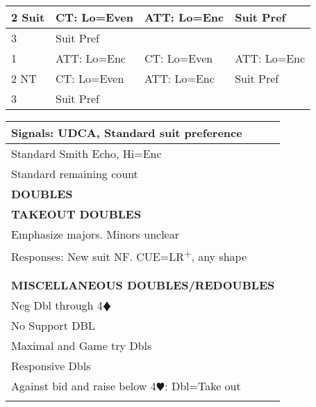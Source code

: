 \documentclass{article}
\newcommand{\he}{\textcolor{RubineRed}{$\varheart$}}
\newcommand{\di}{\textcolor{Peach}{$\vardiamond$}}
\newcommand{\up}{\textsuperscript{+}}
\begin{document}
\begin{minipage}{90mm}
\begin{tabular}{| p{8.9mm} | p{22mm} | p{22mm} | p{22mm} |}
		2 Suit & CT: Lo=Even & ATT: Lo=Enc & Suit Pref \\ \hline
		3 & Suit Pref & & \\ \hline
		1 & ATT: Lo=Enc & CT: Lo=Even & ATT: Lo=Enc \\ \hline
		2 NT & CT: Lo=Even & ATT: Lo=Enc & Suit Pref \\ \hline
		3 & Suit Pref & & \\ \hline
	\end{tabular}
	\begin{tabular}{| p{88mm} |}
		Signals: UDCA, Standard suit preference \\ \hline
		Standard Smith Echo, Hi=Enc \\ \hline
		Standard remaining count \\ \hline
		\cellcolor[gray]{0.9} \textbf{DOUBLES} \\ \hline
		\cellcolor[gray]{0.9} \textbf{TAKEOUT DOUBLES} \\ \hline
		Emphasize majors. Minors unclear \\ \hline
		Responses: New suit NF. CUE=LR\up{}, any shape \\ \hline
		\\ \hline
		\\ \hline
		\cellcolor[gray]{0.9} \textbf{MISCELLANEOUS DOUBLES/REDOUBLES} \\ \hline
		Neg Dbl through 4\di{} \\ \hline
		No Support DBL \\ \hline
		Maximal and Game try Dbls \\ \hline
		Responsive Dbls \\ \hline
		Against bid and raise below 4\he{}: Dbl=Take out\\ \hline
		\\ \hline
	\end{tabular}
\end{minipage}
\begin{minipage}{5mm}
	\begin{tabular}{| p{5mm} |}
	\end{tabular}
\end{minipage}
\end{document}
